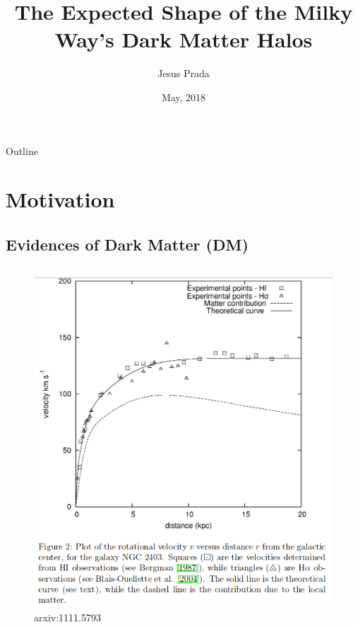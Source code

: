 \documentclass[xcolor=dvipsnames]{beamer}
\title{\textbf{The Expected Shape of the Milky Way's Dark Matter Halos }}
\author{Jesus Prada}
\institute[{\color{Black} Universidad de los Andes}] %
{
 \normalsize Advisors:\\
 PhD Jaime E. Forero-Romero \\ \small Universidad de los Andes, Departamento de Física\\
  \vspace{5mm}
 \normalsize PhD Volker Springel \\ \small  Heidelberg's Institute of Theoretical studies
}
\date{ \footnotesize May, 2018}
\begin{document}
\begin{frame}
  \titlepage
\end{frame}
\begin{frame}{Outline}
 \tableofcontents
\end{frame}
\section{Motivation}
\subsection{Evidences of Dark Matter (DM)}
\begin{frame}

\begin{columns}[c]

\begin{column}{.5\textwidth}
\begin{figure}
\includegraphics[width=1\linewidth]{./pics/RotationCurves.png}
\caption{\tiny arxiv:1111.5793}
\end{figure}
\end{column}


\end{columns}
\end{frame}
\end{document}

